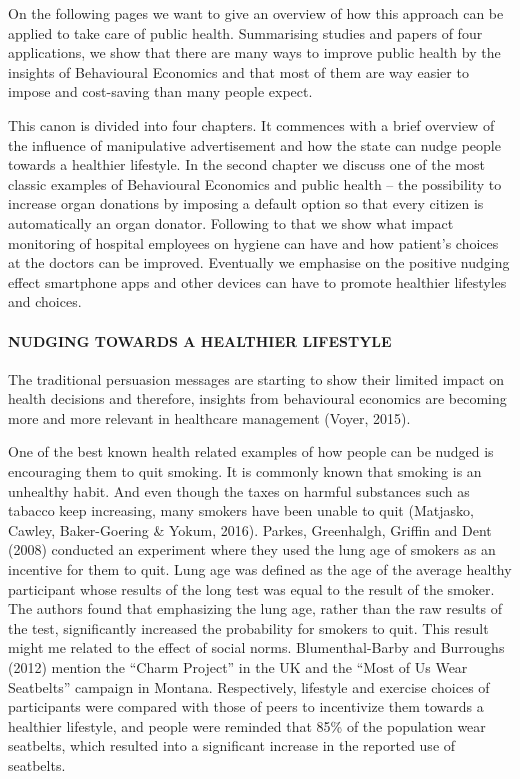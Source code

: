 \documentclass[]{article}
\let\oldparagraph\paragraph
\renewcommand{\paragraph}[1]{\oldparagraph{#1}\mbox{}}
\begin{document}
On the following pages we want to give an overview of how this approach
can be applied to take care of public health. Summarising studies and
papers of four applications, we show that there are many ways to improve
public health by the insights of Behavioural Economics and that most of
them are way easier to impose and cost-saving than many people expect.

This canon is divided into four chapters. It commences with a brief
overview of the influence of manipulative advertisement and how the
state can nudge people towards a healthier lifestyle. In the second
chapter we discuss one of the most classic examples of Behavioural
Economics and public health -- the possibility to increase organ
donations by imposing a default option so that every citizen is
automatically an organ donator. Following to that we show what impact
monitoring of hospital employees on hygiene can have and how patient's
choices at the doctors can be improved. Eventually we emphasise on the
positive nudging effect smartphone apps and other devices can have to
promote healthier lifestyles and choices.

\paragraph{NUDGING TOWARDS A HEALTHIER
LIFESTYLE}\label{nudging-towards-a-healthier-lifestyle}

The traditional persuasion messages are starting to show their limited
impact on health decisions and therefore, insights from behavioural
economics are becoming more and more relevant in healthcare management
(Voyer, 2015).

One of the best known health related examples of how people can be
nudged is encouraging them to quit smoking. It is commonly known that
smoking is an unhealthy habit. And even though the taxes on harmful
substances such as tabacco keep increasing, many smokers have been
unable to quit (Matjasko, Cawley, Baker-Goering \& Yokum, 2016). Parkes,
Greenhalgh, Griffin and Dent (2008) conducted an experiment where they
used the lung age of smokers as an incentive for them to quit. Lung age
was defined as the age of the average healthy participant whose results
of the long test was equal to the result of the smoker. The authors
found that emphasizing the lung age, rather than the raw results of the
test, significantly increased the probability for smokers to quit. This
result might me related to the effect of social norms. Blumenthal-Barby
and Burroughs (2012) mention the ``Charm Project'' in the UK and the
``Most of Us Wear Seatbelts'' campaign in Montana. Respectively,
lifestyle and exercise choices of participants were compared with those
of peers to incentivize them towards a healthier lifestyle, and people
were reminded that 85\% of the population wear seatbelts, which resulted
into a significant increase in the reported use of seatbelts.
\end{document}
